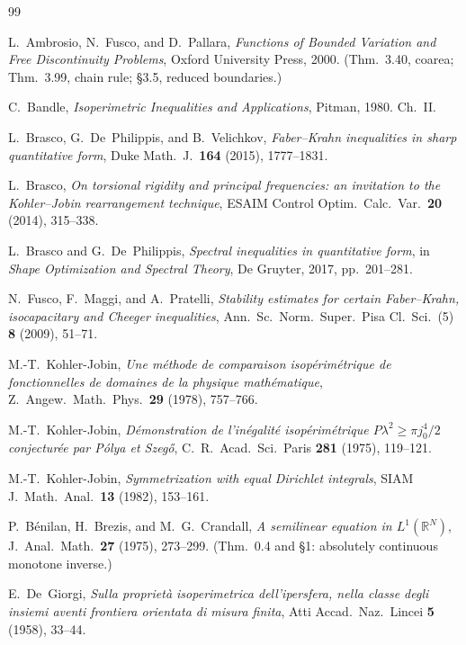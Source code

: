 \documentclass[11pt]{amsart}
\theoremstyle{definition}
\newcommand{\R}{\mathbb R}
\begin{document}
\begin{thebibliography}{99}

L.~Ambrosio, N.~Fusco, and D.~Pallara,
\emph{Functions of Bounded Variation and Free Discontinuity Problems},
Oxford University Press, 2000.
(Thm.~3.40, coarea; Thm.~3.99, chain rule; \S3.5, reduced boundaries.)

C.~Bandle,
\emph{Isoperimetric Inequalities and Applications},
Pitman, 1980. Ch.~II.

L.~Brasco, G.~De~Philippis, and B.~Velichkov,
\emph{Faber--Krahn inequalities in sharp quantitative form},
Duke Math.\ J.\ \textbf{164} (2015), 1777--1831.

L.~Brasco,
\emph{On torsional rigidity and principal frequencies: an invitation to the
Kohler--Jobin rearrangement technique},
ESAIM Control Optim.\ Calc.\ Var.\ \textbf{20} (2014), 315--338.

L.~Brasco and G.~De~Philippis,
\emph{Spectral inequalities in quantitative form}, in
\emph{Shape Optimization and Spectral Theory}, De Gruyter, 2017, pp.~201--281.

N.~Fusco, F.~Maggi, and A.~Pratelli,
\emph{Stability estimates for certain Faber--Krahn, isocapacitary and Cheeger
inequalities},
Ann.\ Sc.\ Norm.\ Super.\ Pisa Cl.\ Sci.\ (5) \textbf{8} (2009), 51--71.

M.-T.~Kohler-Jobin,
\emph{Une m\'ethode de comparaison isop\'erim\'etrique de fonctionnelles de
domaines de la physique math\'ematique},
Z.\ Angew.\ Math.\ Phys.\ \textbf{29} (1978), 757--766.

M.-T.~Kohler-Jobin,
\emph{D\'emonstration de l'in\'egalit\'e isop\'erim\'etrique
\(P\lambda^2\ge\pi j_0^4/2\) conjectur\'ee par P\'olya et Szeg\H{o}},
C.\ R.\ Acad.\ Sci.\ Paris \textbf{281} (1975), 119--121.

M.-T.~Kohler-Jobin,
\emph{Symmetrization with equal Dirichlet integrals},
SIAM J.\ Math.\ Anal.\ \textbf{13} (1982), 153--161.

P.~B\'enilan, H.~Brezis, and M.~G.~Crandall,
\emph{A semilinear equation in \(L^1(\R^N)\)},
J.~Anal.\ Math.\ \textbf{27} (1975), 273--299.
(Thm.~0.4 and \S1: absolutely continuous monotone inverse.)

E.~De~Giorgi,
\emph{Sulla propriet\`a isoperimetrica dell'ipersfera, nella classe degli
insiemi aventi frontiera orientata di misura finita},
Atti Accad.\ Naz.\ Lincei \textbf{5} (1958), 33--44.


\end{thebibliography}
\end{document}

